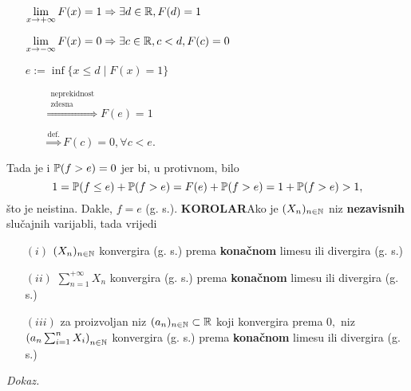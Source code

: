 \documentclass{article}
\begin{document}
\begin{enumerate}
    \item[] \(\lim\limits_{x\to+\infty}F(x)=1\Rightarrow\exists d\in\Bbb R, F(d)=1\)
    \item[] \(\lim\limits_{x\to-\infty}F(x)=0\Rightarrow\exists c\in\Bbb R,c<d, F(c)=0\)
    \item[] \(e:=\inf\{x\le d\mid F(x)=1\}\)
        \begin{enumerate}
            \item[] \(\overset{\substack{\text{neprekidnost}\\\text{zdesna}}}{\Rightarrow}F(e)=1\) 
            \item[] \(\overset{\text{def.}}{\Rightarrow}F(c)=0,\forall c<e.\)
        \end{enumerate}
\end{enumerate}
Tada je i \(\Bbb P(f>e)=0\) jer bi, u protivnom, bilo \[1=\Bbb P(f\le e)+\Bbb P(f>e)=F(e)+\Bbb P(f>e)=1+\Bbb P(f>e)>1,\] što je neistina. Dakle, \(f=e\) (g. s.).\newline\newline
\textbf{KOROLAR}\newline Ako je \((X_n)_{n\in\Bbb N}\) niz \textbf{nezavisnih} slučajnih varijabli, tada vrijedi
\begin{enumerate}
    \item[\((i)\)] \((X_n)_{n\in\Bbb N}\) konvergira (g. s.) prema \textbf{konačnom} limesu ili divergira (g. s.)
    \item[\((ii)\)] \(\sum_{n=1}^{+\infty}X_n\) konvergira (g. s.) prema \textbf{konačnom} limesu ili divergira (g. s.)
    \item[\((iii)\)] za proizvoljan niz \((a_n)_{n\in\Bbb N}\subset\Bbb R\) koji konvergira prema \(0,\) niz \(\left(a_n\sum_{i=1}^nX_i\right)_{n\in\Bbb N}\) konvergira (g. s.) prema \textbf{konačnom} limesu ili divergira (g. s.)
\end{enumerate}
\textit{Dokaz.}
\end{document}
